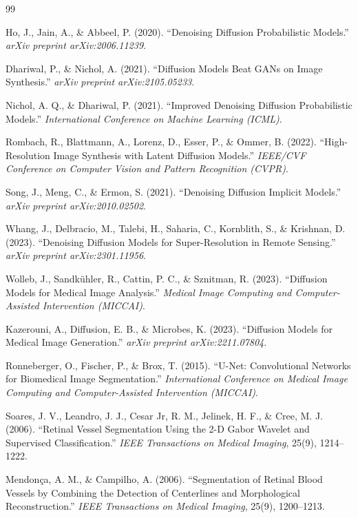 \documentclass[11pt]{article}
\begin{document}
\begin{thebibliography}{99}

Ho, J., Jain, A., \& Abbeel, P. (2020).
``Denoising Diffusion Probabilistic Models.''
\textit{arXiv preprint arXiv:2006.11239}.

Dhariwal, P., \& Nichol, A. (2021).
``Diffusion Models Beat GANs on Image Synthesis.''
\textit{arXiv preprint arXiv:2105.05233}.

Nichol, A. Q., \& Dhariwal, P. (2021).
``Improved Denoising Diffusion Probabilistic Models.''
\textit{International Conference on Machine Learning (ICML)}.

Rombach, R., Blattmann, A., Lorenz, D., Esser, P., \& Ommer, B. (2022).
``High-Resolution Image Synthesis with Latent Diffusion Models.''
\textit{IEEE/CVF Conference on Computer Vision and Pattern Recognition (CVPR)}.

Song, J., Meng, C., \& Ermon, S. (2021).
``Denoising Diffusion Implicit Models.''
\textit{arXiv preprint arXiv:2010.02502}.

Whang, J., Delbracio, M., Talebi, H., Saharia, C., Kornblith, S., \& Krishnan, D. (2023).
``Denoising Diffusion Models for Super-Resolution in Remote Sensing.''
\textit{arXiv preprint arXiv:2301.11956}.

Wolleb, J., Sandkühler, R., Cattin, P. C., \& Sznitman, R. (2023).
``Diffusion Models for Medical Image Analysis.''
\textit{Medical Image Computing and Computer-Assisted Intervention (MICCAI)}.

Kazerouni, A., Diffusion, E. B., \& Microbes, K. (2023).
``Diffusion Models for Medical Image Generation.''
\textit{arXiv preprint arXiv:2211.07804}.

Ronneberger, O., Fischer, P., \& Brox, T. (2015).
``U-Net: Convolutional Networks for Biomedical Image Segmentation.''
\textit{International Conference on Medical Image Computing and Computer-Assisted Intervention (MICCAI)}.

Soares, J. V., Leandro, J. J., Cesar Jr, R. M., Jelinek, H. F., \& Cree, M. J. (2006).
``Retinal Vessel Segmentation Using the 2-D Gabor Wavelet and Supervised Classification.''
\textit{IEEE Transactions on Medical Imaging}, 25(9), 1214--1222.

Mendonça, A. M., \& Campilho, A. (2006).
``Segmentation of Retinal Blood Vessels by Combining the Detection of Centerlines and Morphological Reconstruction.''
\textit{IEEE Transactions on Medical Imaging}, 25(9), 1200--1213.


\end{thebibliography}
\end{document}
